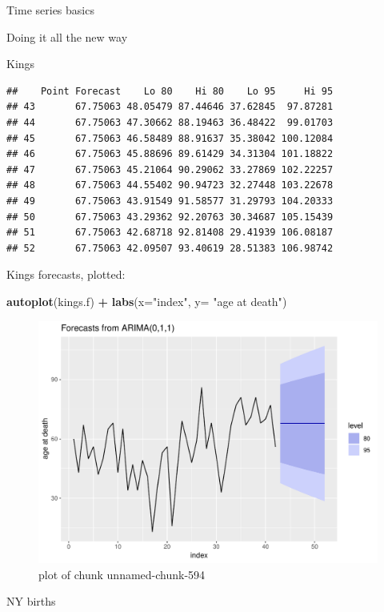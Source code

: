 \documentclass[ignorenonframetext,]{beamer}
\newenvironment{Shaded}{\begin{snugshade}}{\end{snugshade}}
\newcommand{\DataTypeTok}[1]{\textcolor[rgb]{0.13,0.29,0.53}{#1}}
\newcommand{\KeywordTok}[1]{\textcolor[rgb]{0.13,0.29,0.53}{\textbf{#1}}}
\newcommand{\NormalTok}[1]{#1}
\newcommand{\OperatorTok}[1]{\textcolor[rgb]{0.81,0.36,0.00}{\textbf{#1}}}
\newcommand{\StringTok}[1]{\textcolor[rgb]{0.31,0.60,0.02}{#1}}
\begin{document}
\begin{frame}[fragile]{Time series basics}
\begin{block}{Doing it all the new way}
\begin{block}{Kings}
\begin{verbatim}
##    Point Forecast    Lo 80    Hi 80    Lo 95     Hi 95
## 43       67.75063 48.05479 87.44646 37.62845  97.87281
## 44       67.75063 47.30662 88.19463 36.48422  99.01703
## 45       67.75063 46.58489 88.91637 35.38042 100.12084
## 46       67.75063 45.88696 89.61429 34.31304 101.18822
## 47       67.75063 45.21064 90.29062 33.27869 102.22257
## 48       67.75063 44.55402 90.94723 32.27448 103.22678
## 49       67.75063 43.91549 91.58577 31.29793 104.20333
## 50       67.75063 43.29362 92.20763 30.34687 105.15439
## 51       67.75063 42.68718 92.81408 29.41939 106.08187
## 52       67.75063 42.09507 93.40619 28.51383 106.98742
\end{verbatim}

Kings forecasts, plotted:

\begin{Shaded}
\begin{Highlighting}[]
\KeywordTok{autoplot}\NormalTok{(kings.f) }\OperatorTok{+}\StringTok{ }\KeywordTok{labs}\NormalTok{(}\DataTypeTok{x=}\StringTok{"index"}\NormalTok{, }\DataTypeTok{y=} \StringTok{"age at death"}\NormalTok{)}
\end{Highlighting}
\end{Shaded}

\begin{figure}
\centering
\includegraphics{figure/unnamed-chunk-594-1.pdf}
\caption{plot of chunk unnamed-chunk-594}
\end{figure}

\end{block}

\begin{block}{NY births}


\end{block}
\end{block}
\end{frame}
\end{document}

